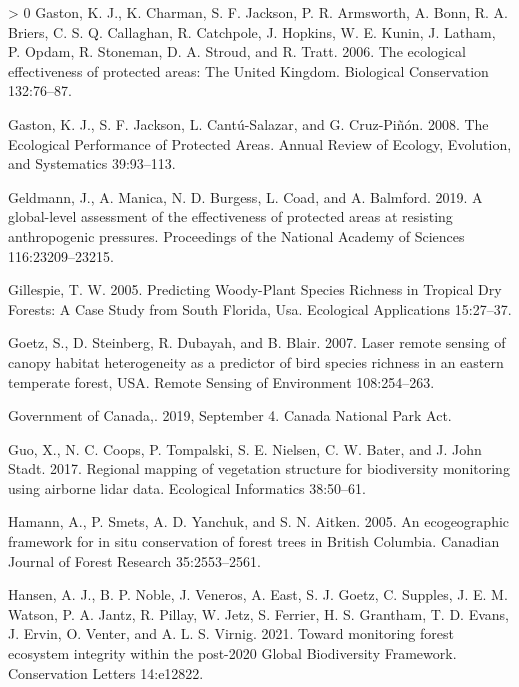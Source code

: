 \documentclass[11pt]{article}
\newlength{\cslhangindent}
\newenvironment{CSLReferences}[3] %
 {%
  \setlength{\parindent}{0pt}
  \ifodd #1 \everypar{\setlength{\hangindent}{\cslhangindent}}\ignorespaces\fi
  \ifnum #2 > 0
  \setlength{\parskip}{#2\baselineskip}
  \fi
 }%
 {}
\begin{document}
\begin{CSLReferences}{1}{0}
\leavevmode\hypertarget{ref-gastonEcologicalEffectivenessProtected2006}{}%
Gaston, K. J., K. Charman, S. F. Jackson, P. R. Armsworth, A. Bonn, R.
A. Briers, C. S. Q. Callaghan, R. Catchpole, J. Hopkins, W. E. Kunin, J.
Latham, P. Opdam, R. Stoneman, D. A. Stroud, and R. Tratt. 2006. The
ecological effectiveness of protected areas: The United Kingdom.
Biological Conservation 132:76--87.

\leavevmode\hypertarget{ref-gastonEcologicalPerformanceProtected2008}{}%
Gaston, K. J., S. F. Jackson, L. Cantú-Salazar, and G. Cruz-Piñón. 2008.
The Ecological Performance of Protected Areas. Annual Review of Ecology,
Evolution, and Systematics 39:93--113.

\leavevmode\hypertarget{ref-geldmannGloballevelAssessmentEffectiveness2019}{}%
Geldmann, J., A. Manica, N. D. Burgess, L. Coad, and A. Balmford. 2019.
A global-level assessment of the effectiveness of protected areas at
resisting anthropogenic pressures. Proceedings of the National Academy
of Sciences 116:23209--23215.

\leavevmode\hypertarget{ref-gillespie2005}{}%
Gillespie, T. W. 2005. Predicting Woody-Plant Species Richness in
Tropical Dry Forests: A Case Study from South Florida, Usa. Ecological
Applications 15:27--37.

\leavevmode\hypertarget{ref-goetz2007}{}%
Goetz, S., D. Steinberg, R. Dubayah, and B. Blair. 2007. Laser remote
sensing of canopy habitat heterogeneity as a predictor of bird species
richness in an eastern temperate forest, USA. Remote Sensing of
Environment 108:254--263.

\leavevmode\hypertarget{ref-governmentofcanada2019}{}%
Government of Canada,. 2019, September 4. Canada National Park Act.

\leavevmode\hypertarget{ref-guo2017}{}%
Guo, X., N. C. Coops, P. Tompalski, S. E. Nielsen, C. W. Bater, and J.
John Stadt. 2017. Regional mapping of vegetation structure for
biodiversity monitoring using airborne lidar data. Ecological
Informatics 38:50--61.

\leavevmode\hypertarget{ref-hamann2005}{}%
Hamann, A., P. Smets, A. D. Yanchuk, and S. N. Aitken. 2005. An
ecogeographic framework for in situ conservation of forest trees in
British Columbia. Canadian Journal of Forest Research 35:2553--2561.

\leavevmode\hypertarget{ref-hansenMonitoringForestEcosystem2021}{}%
Hansen, A. J., B. P. Noble, J. Veneros, A. East, S. J. Goetz, C.
Supples, J. E. M. Watson, P. A. Jantz, R. Pillay, W. Jetz, S. Ferrier,
H. S. Grantham, T. D. Evans, J. Ervin, O. Venter, and A. L. S. Virnig.
2021. Toward monitoring forest ecosystem integrity within the post-2020
Global Biodiversity Framework. Conservation Letters 14:e12822.


\end{CSLReferences}
\end{document}

